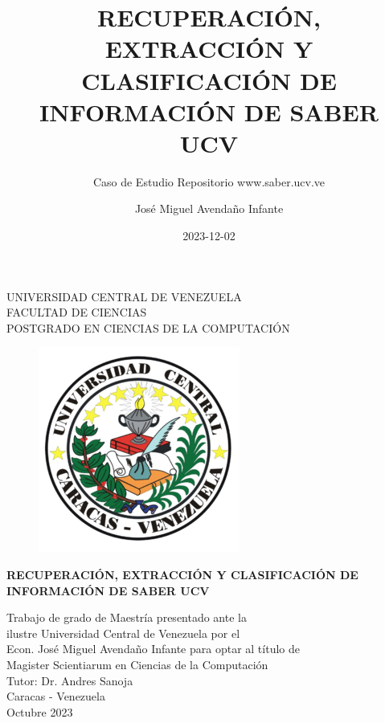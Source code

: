 \documentclass[
  12pt,
  openany]{book}
\title{RECUPERACIÓN, EXTRACCIÓN Y CLASIFICACIÓN DE INFORMACIÓN DE SABER UCV}
\subtitle{Caso de Estudio Repositorio www.saber.ucv.ve}
\author{José Miguel Avendaño Infante}
\date{2023-12-02}
\begin{document}
\maketitle

\thispagestyle{empty}
\begin{center}
	UNIVERSIDAD CENTRAL DE VENEZUELA\\
	FACULTAD DE CIENCIAS\\
	POSTGRADO EN CIENCIAS DE LA COMPUTACI\'ON\\

	\begin{figure}
						\centering
						  \includegraphics[height=.7\textwidth]{images/UCV.png}
  \end{figure}
  \vspace{1.5cm}
  \large{\textbf{RECUPERACI\'ON, EXTRACCI\'ON Y CLASIFICACI\'ON DE \\ INFORMACI\'ON DE SABER UCV}}

  \vspace{3cm}
  Trabajo de grado de Maestría presentado ante la \\
  ilustre Universidad Central de Venezuela por el\\
  Econ. José Miguel Avendaño Infante para  optar
  al título de \\Magister Scientiarum en Ciencias de la Computaci\'on\\
  \vspace{0.5cm}
  Tutor: Dr. Andres Sanoja\\
  \vspace{1.5cm}
  Caracas - Venezuela\\
  Octubre 2023
\end{center}
\end{document}

